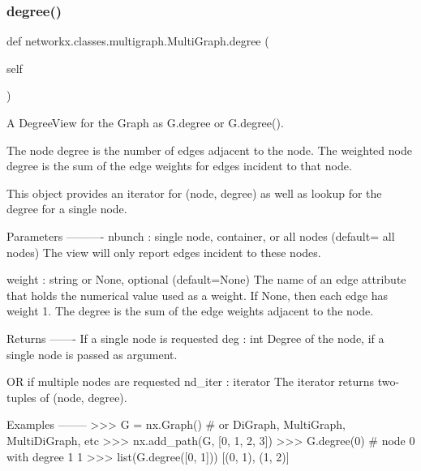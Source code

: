  \mbox{\label{classnetworkx_1_1classes_1_1multigraph_1_1MultiGraph_aa046c07b6417eb53e754adc9b1b631b0}} 
\subsubsection{\texorpdfstring{degree()}{degree()}}
{\footnotesize\ttfamily def networkx.\+classes.\+multigraph.\+Multi\+Graph.\+degree (\begin{DoxyParamCaption}\item[{}]{self }\end{DoxyParamCaption})}

\begin{DoxyVerb}A DegreeView for the Graph as G.degree or G.degree().

The node degree is the number of edges adjacent to the node.
The weighted node degree is the sum of the edge weights for
edges incident to that node.

This object provides an iterator for (node, degree) as well as
lookup for the degree for a single node.

Parameters
----------
nbunch : single node, container, or all nodes (default= all nodes)
    The view will only report edges incident to these nodes.

weight : string or None, optional (default=None)
   The name of an edge attribute that holds the numerical value used
   as a weight.  If None, then each edge has weight 1.
   The degree is the sum of the edge weights adjacent to the node.

Returns
-------
If a single node is requested
deg : int
    Degree of the node, if a single node is passed as argument.

OR if multiple nodes are requested
nd_iter : iterator
    The iterator returns two-tuples of (node, degree).

Examples
--------
>>> G = nx.Graph()  # or DiGraph, MultiGraph, MultiDiGraph, etc
>>> nx.add_path(G, [0, 1, 2, 3])
>>> G.degree(0)  # node 0 with degree 1
1
>>> list(G.degree([0, 1]))
[(0, 1), (1, 2)]\end{DoxyVerb}
 \mbox{\label{classnetworkx_1_1classes_1_1multigraph_1_1MultiGraph_ae17fc1693be84c2794bd039cfe9a16f9}} 
